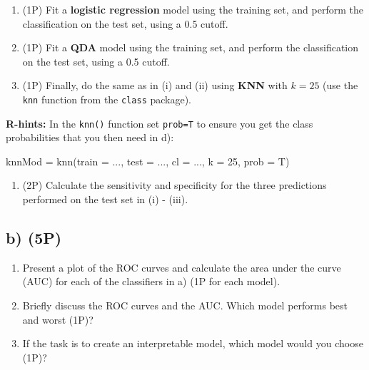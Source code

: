 \documentclass[
]{article}
\newenvironment{Shaded}{\begin{snugshade}}{\end{snugshade}}
\newcommand{\AttributeTok}[1]{\textcolor[rgb]{0.77,0.63,0.00}{#1}}
\newcommand{\DecValTok}[1]{\textcolor[rgb]{0.00,0.00,0.81}{#1}}
\newcommand{\FunctionTok}[1]{\textcolor[rgb]{0.00,0.00,0.00}{#1}}
\newcommand{\NormalTok}[1]{#1}
\newcommand{\OtherTok}[1]{\textcolor[rgb]{0.56,0.35,0.01}{#1}}
\providecommand{\tightlist}{%
  \setlength{\itemsep}{0pt}\setlength{\parskip}{0pt}}
\begin{document}
\begin{enumerate}
\def\labelenumi{(\roman{enumi})}
\item
  (1P) Fit a \textbf{logistic regression} model using the training set,
  and perform the classification on the test set, using a 0.5 cutoff.
\item
  (1P) Fit a \textbf{QDA} model using the training set, and perform the
  classification on the test set, using a 0.5 cutoff.
\item
  (1P) Finally, do the same as in (i) and (ii) using \textbf{KNN} with
  \(k = 25\) (use the \texttt{knn} function from the \texttt{class}
  package).
\end{enumerate}

\textbf{R-hints:} In the \texttt{knn()} function set \texttt{prob=T} to
ensure you get the class probabilities that you then need in d):

\begin{Shaded}
\begin{Highlighting}[]
\NormalTok{knnMod }\OtherTok{=} \FunctionTok{knn}\NormalTok{(}\AttributeTok{train =}\NormalTok{ ..., }\AttributeTok{test =}\NormalTok{ ..., }\AttributeTok{cl =}\NormalTok{ ..., }\AttributeTok{k =} \DecValTok{25}\NormalTok{, }\AttributeTok{prob =}\NormalTok{ T)}
\end{Highlighting}
\end{Shaded}

\begin{enumerate}
\def\labelenumi{(\roman{enumi})}
\setcounter{enumi}{3}
\tightlist
\item
  (2P) Calculate the sensitivity and specificity for the three
  predictions performed on the test set in (i) - (iii).
\end{enumerate}

\hypertarget{b-5p}{%
\subsection{b) (5P)}\label{b-5p}}

\begin{enumerate}
\def\labelenumi{(\roman{enumi})}
\tightlist
\item
  Present a plot of the ROC curves and calculate the area under the
  curve (AUC) for each of the classifiers in a) (1P for each model).
\item
  Briefly discuss the ROC curves and the AUC. Which model performs best
  and worst (1P)?
\item
  If the task is to create an interpretable model, which model would you
  choose (1P)?
\end{enumerate}
\end{document}
